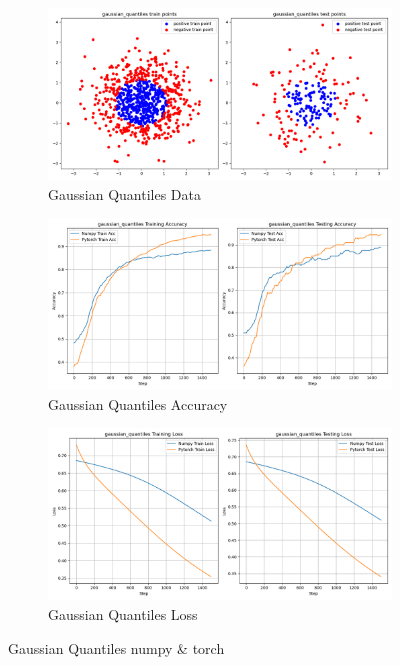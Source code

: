 \documentclass{article}
\begin{document}
\begin{appendix}
\begin{figure}[!htbp]
  \centering
  \begin{subfigure}[b]{0.85\textwidth}
    \includegraphics[width=\textwidth]{img/Part1/data_gaussian_quantiles.png}
    \caption{Gaussian Quantiles Data}
  \end{subfigure}
  \begin{subfigure}[b]{0.9\textwidth}
    \includegraphics[width=\textwidth]{img/Part1/acc_gaussian_quantiles.png}
    \caption{Gaussian Quantiles Accuracy}
  \end{subfigure}
\begin{subfigure}[b]{0.9\textwidth}
    \includegraphics[width=\textwidth]{img/Part1/loss_gaussian_quantiles.png}
    \caption{Gaussian Quantiles Loss}
  \end{subfigure}
  \caption{Gaussian Quantiles numpy \& torch}
  \label{fig:p1t1_gaussian_quantiles}
\end{figure}


\end{appendix}
\end{document}
